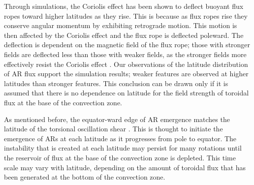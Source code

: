 Through simulations, the Coriolis effect has been shown to deflect buoyant flux ropes toward higher latitudes as they rise. This is because as flux ropes rise they conserve angular momentum by exhibiting retrograde motion. This motion is then affected by the Coriolis effect and the flux rope is deflected poleward. The deflection is dependent on the magnetic field of the flux rope; those with stronger fields are deflected less than those with weaker fields, as the stronger fields more effectively resist the Coriolis effect \citep[][and references therein]{Fan:2009}. Our observations of the latitude distribution of \gls{AR} flux support the simulation results; weaker features are observed at higher latitudes than stronger features. This conclusion can be drawn only if it is assumed that there is no dependence on latitude for the field strength of toroidal flux at the base of the convection zone. 

As mentioned before, the equator-ward edge of \gls{AR} emergence matches the latitude of the torsional oscillation shear \citep{Howe:2011}. This is thought to initiate the emergence of \glspl{AR} at each latitude as it progresses from pole to equator. The instability that is created at each latitude may persist for many rotations until the reservoir of flux at the base of the convection zone is depleted. This time scale may vary with latitude, depending on the amount of toroidal flux that has been generated at the bottom of the convection zone. 


